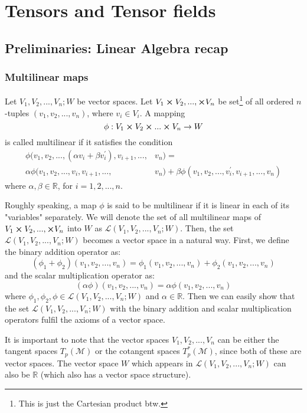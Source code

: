 \chapter{Tensors and Tensor fields}
  \section{Preliminaries: Linear Algebra recap}
    \label{sec: preliminaries linear algebra recap}
    \subsection{Multilinear maps}
      \label{subsec: multilinear maps}
      \begin{definition}
        Let $V_1, V_2, ..., V_n; W$ be vector spaces. Let $V_1 \cross
        V_2,...,\cross V_n$ be set\footnote{This is just the Cartesian product
        btw.} of all ordered $n$-tuples $(v_1,v_2,...,v_n)$, where $v_i \in
        V_i$. A mapping \[\phi: V_1 \cross V_2 \cross ... \cross V_n
        \rightarrow W\] is called multilinear if it satisfies the condition
        \begin{equation*}
          \begin{split}
        \phi(v_1,v_2,...,(\alpha v_i + \beta v_i^\prime), v_{i+1}, ... ,&v_n) =
        \\
        \alpha \phi(v_1,v_2,...,v_i, v_{i+1}, ... ,&v_n) + \beta
        \phi(v_1,v_2,...,v_i^\prime, v_{i+1}, ... ,v_n)
          \end{split}
        \end{equation*}
        where $\alpha,\beta \in \mathbb{R}$, for $i = 1,2,...,n$.
      \end{definition}
      \begin{remark}
        Roughly speaking, a map $\phi$ is said to be multilinear if it is
        linear in each of its "variables" separately. We will denote the set of
        all multilinear maps of $V_1 \cross V_2,...,\cross V_n$ into $W$ as
        $\mathcal{L}(V_1,V_2,...,V_n;W)$. Then, the set $
        \mathcal{L}(V_1,V_2,...,V_n;W)$ becomes a vector space in a natural
        way. First, we define the binary addition operator as:
        \[\left(\phi_1 + \phi_2\right)(v_1,v_2,...,v_n) =\phi_1(v_1,v_2,...,v_n)
        + \phi_2(v_1,v_2,...,v_n)\]
        and the scalar multiplication operator as:
        \[\left(\alpha\phi\right)(v_1,v_2,...,v_n) =
        \alpha\phi(v_1,v_2,...,v_n)\]
        where $\phi_1,\phi_2,\phi \in \mathcal{L}(V_1,V_2,...,V_n;W)$ and
        $\alpha \in \mathbb{R}$.
        Then we can easily show that the set $\mathcal{L}(V_1,V_2,...,V_n;W)$
        with the binary addition and scalar multiplication operators fulfil the axioms of a vector space.

        It is important to note that the vector spaces $V_1,V_2,...,V_n$ can be
        either the tangent spaces $T_p(\mathcal{M})$ or the cotangent spaces
        $T^*_p(\mathcal{M})$, since both of these are vector spaces. The vector
        space $W$ which appears in $\mathcal{L}(V_1,V_2,...,V_n;W)$ can also be $\mathbb{R}$ (which also has a vector space structure).
      \end{remark}

